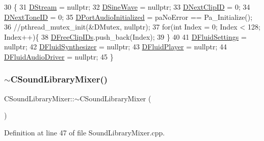 \begin{DoxyCode}
30                                       \{
31     \hyperlink{classCSoundLibraryMixer_ad992cd6202130db3a45ca695eca34625}{DStream} = \textcolor{keyword}{nullptr};
32     \hyperlink{classCSoundLibraryMixer_a7d696c93362c862bfc651a28ee8f67cf}{DSineWave} = \textcolor{keyword}{nullptr};
33     \hyperlink{classCSoundLibraryMixer_a9bbd8e4d0945a06cdb3b21aa05ddeb60}{DNextClipID} = 0;
34     \hyperlink{classCSoundLibraryMixer_a88efc1ea710744bceadccf66967f9736}{DNextToneID} = 0;
35     \hyperlink{classCSoundLibraryMixer_a1c78419f5e6cfdf4bc879bb5eedf52f0}{DPortAudioInitialized} = paNoError == Pa\_Initialize();
36     \textcolor{comment}{//pthread\_mutex\_init(&DMutex, nullptr);}
37     \textcolor{keywordflow}{for}(\textcolor{keywordtype}{int} Index = 0; Index < 128; Index++)\{
38         \hyperlink{classCSoundLibraryMixer_a32956ae09580a1ae4c9c037f0f7b5c0b}{DFreeClipIDs}.push\_back(Index);   
39     \}
40     
41     \hyperlink{classCSoundLibraryMixer_a2c6fb394c8bed99adb019576dc7f6eee}{DFluidSettings} = \textcolor{keyword}{nullptr};
42     \hyperlink{classCSoundLibraryMixer_a6c1663c381dbf2aa18c82a23141f409c}{DFluidSynthesizer} = \textcolor{keyword}{nullptr};
43     \hyperlink{classCSoundLibraryMixer_a6773ddf83ef86bc27598f6c5cee61d9c}{DFluidPlayer} = \textcolor{keyword}{nullptr};
44     \hyperlink{classCSoundLibraryMixer_a4ba4ccc9c6603c98a5432042e779977e}{DFluidAudioDriver} = \textcolor{keyword}{nullptr};
45 \}
\end{DoxyCode}
\hypertarget{classCSoundLibraryMixer_a73733f975356d1f21834d72503bc580f}{}\label{classCSoundLibraryMixer_a73733f975356d1f21834d72503bc580f} 
\subsubsection{\texorpdfstring{$\sim$\+C\+Sound\+Library\+Mixer()}{~CSoundLibraryMixer()}}
{\footnotesize\ttfamily C\+Sound\+Library\+Mixer\+::$\sim$\+C\+Sound\+Library\+Mixer (\begin{DoxyParamCaption}{ }\end{DoxyParamCaption})}



Definition at line 47 of file Sound\+Library\+Mixer.\+cpp.


